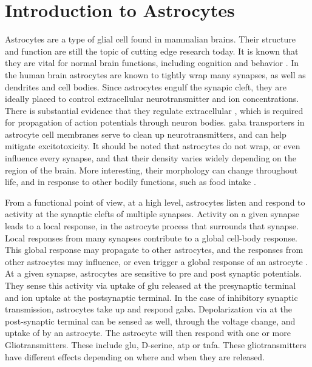     \section{Introduction to Astrocytes}
    Astrocytes are a type of glial cell found in mammalian brains. Their
    structure and function are still the topic of cutting edge research
    today. It is known that they are vital for normal brain functions, including
    cognition and behavior \parencite{mederos_2018}. In the human brain astrocytes
    are known to tightly wrap many synapses, as well as dendrites and cell
    bodies. Since astrocytes engulf the synapic cleft, they are ideally
    placed to control extracellular neurotransmitter and ion
    concentrations. There is substantial evidence that they regulate
    extracellular \kp, which is required for propagation of action potentials
    through neuron bodies. \Gls{gaba} transporters in astrocyte cell membranes
    serve to clean up neurotransmitters, and can help mitigate excitotoxicity. It
    should be noted that astrocytes do not wrap, or even influence every
    synapse, and that their density varies widely depending on the region of the
    brain. More interesting, their morphology can change throughout life, and in
    response to other bodily functions, such as food intake \parencite{mederos_2018}.

    From a functional point of view, at a high level, astrocytes listen and
    respond to activity at the synaptic clefts of multiple synapses. Activity on
    a given synapse leads to a local response, in the astrocyte process that
    surrounds that synapse. Local responses from many synapses contribute to a
    global cell-body response. This global response may propagate to other
    astrocytes, and the responses from other astrocytes may influence, or even
    trigger a global response of an astrocyte \parencite{min_2012}. At a given
    synapse, astrocytes are sensitive to pre and post synaptic potentials. They
    sense this activity via uptake of \gls{glu} released at the presynaptic
    terminal and \kp ion uptake at the postsynaptic terminal. In the case
    of inhibitory synaptic transmission, astrocytes take up and respond
    \gls{gaba}. Depolarization via \kp at the post-synaptic terminal can be
    sensed as well, through the voltage change, and uptake of \kp by an
    astrocyte. The astrocyte will then respond with one or more
    Gliotransmitters. These include \gls{glu}, D-serine, \gls{atp} or
    \gls{tnfa}. These gliotransmitters have different effects depending on where
    and when they are released.

